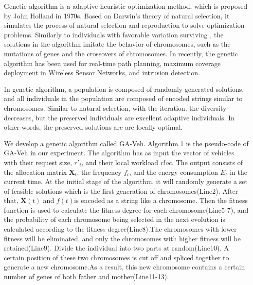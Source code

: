 \documentclass[conference]{IEEEtran}
\begin{document}
Genetic algorithm is a adaptive heuristic optimization method, which is proposed by John Holland in 1970s\cite{gafirst}. Based on Darwin's theory of natural selection, it simulates the process of natural selection and reproduction to solve optimization problems. 
Similarly to individuals with favorable variation surviving , the solutions in the algorithm imitate the behavior of chromosomes, such as the mutations of genes and the crossovers of chromosomes.
In recently, the genetic algorithm has been used for real-time path planning\cite{gapathplan}, maximum coverage deployment in Wireless Sensor Networks\cite{GANetwork}, and intrusion detection\cite{GAIntrusionDetection}. 

In genetic algorithm, a population is composed of randomly generated solutions, and all individuals in the population are composed of encoded strings similar to chromosomes\cite{gaguocheng}.
Similar to natural selection, with the iteration, the diversity decreases, but the preserved individuals are excellent adaptive individuals. In other words, the preserved solutions are are locally optimal.

We develop a genetic algorithm called GA-Veh. 
Algorithm 1 is the pseudo-code of GA-Veh in our experiment. The algorithm has as input the vector of vehicles with their request size, $r'_i$, and their local workload $rloc $. The output consists of the allocation matrix $ \mathbf{X}_t$, the frequency $f_t$, and the energy consumption $E_t$ in the current time. 
At the initial stage of the algorithm, it will randomly generate a set of feasible solutions which is the first generation of chromosomes(Line2).
After that, $\mathbf{X}(t) $ and $ f(t)$is encoded as a string like a chromosome.
Then the fitness function is used to calculate the fitness degree for each chromosome(Line5-7), and the probability of each chromosome being selected in the next evolution is calculated according to the fitness degree(Line8).The chromosomes with lower fitness will be eliminated, and only the chromosomes with higher fitness will be retained(Line9).
Divide the individual into two parts at random(Line10).
A certain position of these two chromosomes is cut off and spliced together to generate a new chromosome.As a result, this new chromosome contains a certain number of genes of both father and mother(Line11-13).
\end{document}
